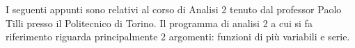 
I seguenti appunti sono relativi al corso di Analisi 2 tenuto dal professor Paolo Tilli presso il Politecnico di Torino.
Il programma di analisi 2 a cui si fa riferimento riguarda principalmente 2 argomenti: funzioni di più variabili e serie.




